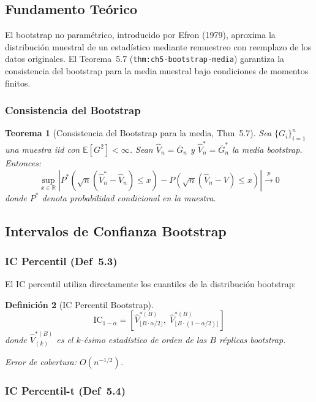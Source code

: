\documentclass[12pt,a4paper]{article}
\newtheorem{theorem}{Teorema}[section]
\newtheorem{definition}[theorem]{Definición}
\begin{document}
\subsection{Fundamento Teórico}

El bootstrap no paramétrico, introducido por Efron (1979), aproxima la distribución muestral de un estadístico mediante remuestreo con reemplazo de los datos originales. El Teorema~5.7 (\texttt{thm:ch5-bootstrap-media}) garantiza la consistencia del bootstrap para la media muestral bajo condiciones de momentos finitos.

\subsubsection{Consistencia del Bootstrap}

\begin{theorem}[Consistencia del Bootstrap para la media, Thm~5.7]
	Sea $\{G_i\}_{i=1}^n$ una muestra iid con $\mathbb{E}[G^2] < \infty$. Sean $\hat{V}_n = \bar{G}_n$ y $\hat{V}_n^* = \bar{G}_n^*$ la media bootstrap. Entonces:
	\[
		\sup_{x \in \mathbb{R}} \left| P^*\left(\sqrt{n}(\hat{V}_n^* - \hat{V}_n) \leq x\right) - P\left(\sqrt{n}(\hat{V}_n - V) \leq x\right) \right| \xrightarrow{p} 0
	\]
	donde $P^*$ denota probabilidad condicional en la muestra.
\end{theorem}

\subsection{Intervalos de Confianza Bootstrap}

\subsubsection{IC Percentil (Def~5.3)}

El IC percentil utiliza directamente los cuantiles de la distribución bootstrap:

\begin{definition}[IC Percentil Bootstrap]
	\[
		\text{IC}_{1-\alpha} = \left[ \hat{V}^{*(B)}_{\lfloor B \cdot \alpha/2 \rfloor},\; \hat{V}^{*(B)}_{\lfloor B \cdot (1-\alpha/2) \rfloor} \right]
	\]
	donde $\hat{V}^{*(B)}_{(k)}$ es el $k$-ésimo estadístico de orden de las $B$ réplicas bootstrap.

	Error de cobertura: $O(n^{-1/2})$.
\end{definition}

\subsubsection{IC Percentil-t (Def~5.4)}
\end{document}
